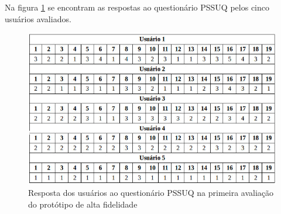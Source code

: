       Na figura \ref{pssuqalta} se encontram as respostas ao questionário PSSUQ pelos cinco usuários avaliados.
      
  \begin{figure}[!htb]
  \centering
  \includegraphics[scale=0.6]{figuras/pssuqalta.jpg}
  \caption{Resposta dos usuários ao questionário PSSUQ na primeira avaliação do protótipo de alta fidelidade}
  \label{pssuqalta}
  \end{figure}